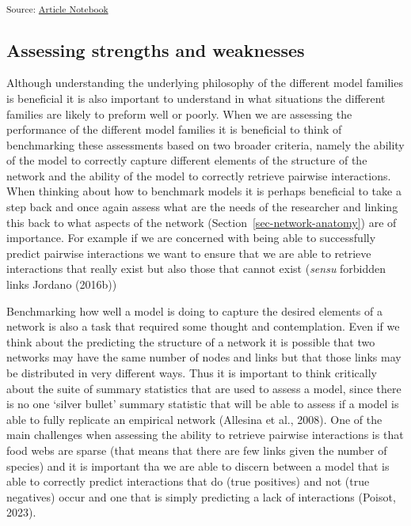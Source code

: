 \documentclass[
]{article}
\begin{document}
\textsubscript{Source:
\href{https://BecksLab.github.io/ms_t_is_for_topology/index.qmd.html}{Article
Notebook}}

\subsection{Assessing strengths and
weaknesses}\label{assessing-strengths-and-weaknesses}

Although understanding the underlying philosophy of the different model
families is beneficial it is also important to understand in what
situations the different families are likely to preform well or poorly.
When we are assessing the performance of the different model families it
is beneficial to think of benchmarking these assessments based on two
broader criteria, namely the ability of the model to correctly capture
different elements of the structure of the network and the ability of
the model to correctly retrieve pairwise interactions. When thinking
about how to benchmark models it is perhaps beneficial to take a step
back and once again assess what are the needs of the researcher and
linking this back to what aspects of the network
(Section~\ref{sec-network-anatomy}) are of importance. For example if we
are concerned with being able to successfully predict pairwise
interactions we want to ensure that we are able to retrieve interactions
that really exist but also those that cannot exist (\emph{sensu}
forbidden links Jordano (2016b))

Benchmarking how well a model is doing to capture the desired elements
of a network is also a task that required some thought and
contemplation. Even if we think about the predicting the structure of a
network it is possible that two networks may have the same number of
nodes and links but that those links may be distributed in very
different ways. Thus it is important to think critically about the suite
of summary statistics that are used to assess a model, since there is no
one `silver bullet' summary statistic that will be able to assess if a
model is able to fully replicate an empirical network (Allesina et al.,
2008). One of the main challenges when assessing the ability to retrieve
pairwise interactions is that food webs are sparse (that means that
there are few links given the number of species) and it is important tha
we are able to discern between a model that is able to correctly predict
interactions that do (true positives) and not (true negatives) occur and
one that is simply predicting a lack of interactions (Poisot, 2023).
\end{document}
